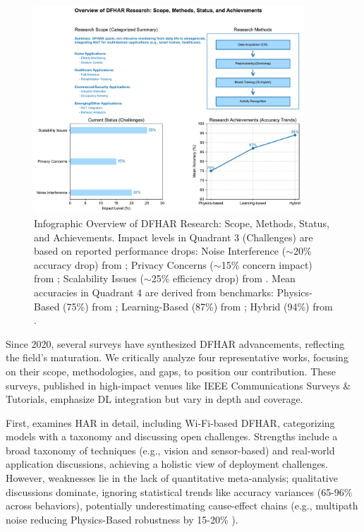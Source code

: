 \documentclass[Afour,sageh,times]{sagej}
\begin{document}
\begin{figure}[htbp]
\centering
\includegraphics[width=0.9\textwidth]{2.dfhar_infographic_updated.pdf}  %
\caption{Infographic Overview of DFHAR Research: Scope, Methods, Status, and Achievements. Impact levels in Quadrant 3 (Challenges) are based on reported performance drops: Noise Interference ($\sim$20\% accuracy drop) from \citep{guo2019robust}; Privacy Concerns ($\sim$15\% concern impact) from \citep{Arshad:2022_har_review}; Scalability Issues ($\sim$25\% efficiency drop) from \citep{zhou2022target}. Mean accuracies in Quadrant 4 are derived from benchmarks: Physics-Based (75\%) from \citep{guo2019robust}; Learning-Based (87\%) from \citep{yang2022deep, Arshad:2022_har_review}; Hybrid (94\%) from \citep{zhou2022target, yang2022efficientfi}.}
\label{fig:dfhar_quadrant}
\end{figure}

Since 2020, several surveys have synthesized DFHAR advancements, reflecting the field's maturation. We critically analyze four representative works, focusing on their scope, methodologies, and gaps, to position our contribution. These surveys, published in high-impact venues like IEEE Communications Surveys \& Tutorials, emphasize DL integration but vary in depth and coverage.

First, \citep{Arshad:2022_har_review} examines HAR in detail, including Wi-Fi-based DFHAR, categorizing models with a taxonomy and discussing open challenges. Strengths include a broad taxonomy of techniques (e.g., vision and sensor-based) and real-world application discussions, achieving a holistic view of deployment challenges. However, weaknesses lie in the lack of quantitative meta-analysis; qualitative discussions dominate, ignoring statistical trends like accuracy variances (65-96\% across behaviors), potentially underestimating cause-effect chains (e.g., multipath noise reducing Physics-Based robustness by 15-20\% \citep{guo2019robust}).
\end{document}
